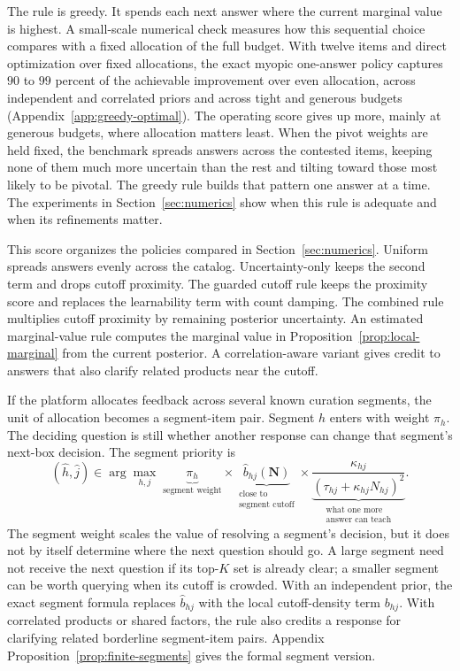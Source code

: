 \documentclass[11pt]{article}
\theoremstyle{definition}
\theoremstyle{remark}
\newcommand{\1}{\mathbf{1}}
\newcommand{\N}{\mathbf{N}}
\begin{document}
The rule is greedy. It spends each next answer where the current
marginal value is highest. A small-scale numerical check measures how
this sequential choice compares with a fixed allocation of the full
budget. With twelve items and direct optimization
over fixed allocations, the exact myopic one-answer policy captures
\(90\) to \(99\) percent of the achievable improvement over even
allocation,
across independent and correlated priors and across tight and generous
budgets (Appendix~\ref{app:greedy-optimal}). The operating score gives up
more, mainly at generous budgets, where allocation matters least. When
the pivot weights are held fixed, the benchmark spreads
answers across the contested items, keeping none of them much more
uncertain than the rest and tilting toward those most likely to be
pivotal. The greedy rule builds that pattern one answer at a time. The
experiments in Section~\ref{sec:numerics} show when this rule is
adequate and when its refinements matter.

This score organizes the policies compared in
Section~\ref{sec:numerics}. Uniform spreads answers evenly across the
catalog. Uncertainty-only keeps the second term and drops cutoff proximity. The
guarded cutoff rule keeps the proximity score and replaces the
learnability term with count damping. The combined rule multiplies
cutoff proximity by remaining posterior uncertainty. An estimated
marginal-value rule computes the marginal value in
Proposition~\ref{prop:local-marginal} from the current posterior. A correlation-aware
variant gives credit to answers that also clarify related products
near the cutoff.

If the platform allocates feedback across several known curation
segments, the unit of allocation becomes a segment-item pair. Segment \(h\) enters with weight \(\pi_h\). The deciding question is
still whether another response can change that segment's next-box
decision. The segment priority is
\[
(\hat h,\hat j)\in\arg\max_{h,j}\;
\underbrace{\pi_h}_{\text{segment weight}}
\times
\underbrace{\widehat b_{hj}(\N)}_{\substack{\text{close to}\\
\text{segment cutoff}}}
\times
\underbrace{\frac{\kappa_{hj}}{(\tau_{hj}+\kappa_{hj}N_{hj})^2}}_{\substack{\text{what one more}\\
\text{answer can teach}}}.
\]
The segment weight scales the value of resolving a segment's decision,
but it does not by itself determine where the next question should go. A
large segment need not receive the next question if its top-\(K\) set is
already clear; a smaller segment can be worth querying when its cutoff
is crowded. With an independent prior, the exact segment formula replaces
\(\widehat b_{hj}\) with the local cutoff-density term \(b_{hj}\). With
correlated products or shared factors, the rule also credits a response
for clarifying related borderline segment-item pairs. Appendix
Proposition~\ref{prop:finite-segments} gives the formal segment version.
\end{document}
